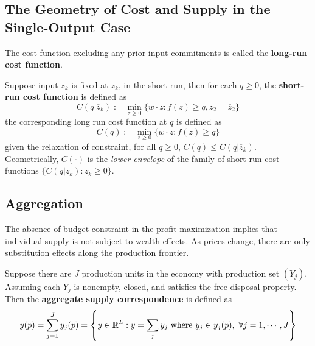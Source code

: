 \documentclass{article}
\begin{document}
	 	\subsection{The Geometry of Cost and Supply in the Single-Output Case}
	 		\begin{definition}
	 			The cost function excluding any prior input commitments is called the \textbf{long-run cost function}.
	 		\end{definition}
	 		
	 		\begin{remark}
	 			Suppose input $z_k$ is fixed at $\overline{z}_k$, in the short run, then for each $q \geq 0$, the \textbf{short-run cost function} is defined as
	 			\begin{equation}
	 				C(q|\overline{z}_k) := \min_{z \geq 0}\{w\cdot z: f(z) \geq q, z_2=\overline{z}_2\}
	 			\end{equation}
	 			the corresponding long run cost function at $q$ is defined as 
	 			\begin{equation}
	 				C(q) := \min_{z \geq 0}\{w\cdot z: f(z) \geq q\}
	 			\end{equation}
	 			given the relaxation of constraint, for all $q \geq 0$, $C(q) \leq C(q|\overline{z}_k)$. Geometrically, $C(\cdot)$ is the \emph{lower envelope} of the family of short-run cost functions $\{C(q|\overline{z}_k): \overline{z}_k \geq 0\}$.
	 		\end{remark}
	 		
	 	\subsection{Aggregation}
	 		\begin{remark}
	 			The absence of budget constraint in the profit maximization implies that individual supply is not subject to wealth effects. As prices change, there are only substitution effects along the production frontier.
	 		\end{remark}
	 		
	 		\begin{definition}
	 			Suppose there are $J$ production units in the economy with production set $(Y_j)$. Assuming each $Y_j$ is nonempty, closed, and satisfies the free disposal property. Then the \textbf{aggregate supply correspondence} is defined as
	 			\begin{equation}
	 				y(p)=\sum_{j=1}^{J} y_{j}(p)=\left\{y \in \mathbb{R}^{L} : y=\sum_{j} y_{j} \text{{ where }} y_{j} \in y_{j}(p),\ \forall j=1, \cdots, J\right\}
	 			\end{equation}
	 		\end{definition}
	 		
\end{document}

